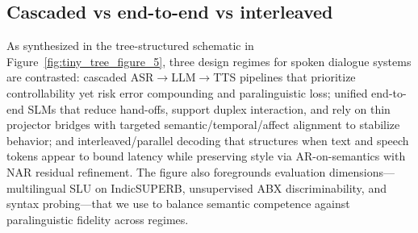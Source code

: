 \documentclass{article}
\begin{document}
\subsection{Cascaded vs end-to-end vs interleaved} \label{subsec:Cascaded vs end-to-end vs interleaved}
As synthesized in the tree-structured schematic in Figure~\ref{fig:tiny_tree_figure_5}, three design regimes for spoken dialogue systems are contrasted: cascaded ASR$\rightarrow$LLM$\rightarrow$TTS pipelines that prioritize controllability yet risk error compounding and paralinguistic loss; unified end-to-end SLMs that reduce hand-offs, support duplex interaction, and rely on thin projector bridges with targeted semantic/temporal/affect alignment to stabilize behavior; and interleaved/parallel decoding that structures when text and speech tokens appear to bound latency while preserving style via AR-on-semantics with NAR residual refinement. The figure also foregrounds evaluation dimensions---multilingual SLU on IndicSUPERB, unsupervised ABX discriminability, and syntax probing---that we use to balance semantic competence against paralinguistic fidelity across regimes.
\end{document}
